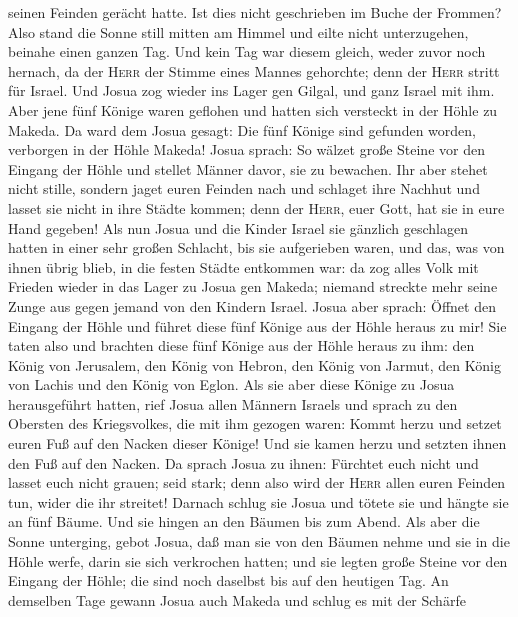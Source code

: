 seinen Feinden gerächt hatte. Ist dies nicht geschrieben im Buche der
Frommen? Also stand die Sonne still mitten am Himmel und eilte nicht
unterzugehen, beinahe einen ganzen Tag.  Und kein Tag war
diesem gleich, weder zuvor noch hernach, da der \textsc{Herr} der Stimme
eines Mannes gehorchte; denn der \textsc{Herr} stritt für Israel.
 Und Josua zog wieder ins Lager gen Gilgal, und ganz
Israel mit ihm.  Aber jene fünf Könige waren geflohen und
hatten sich versteckt in der Höhle zu Makeda.  Da ward
dem Josua gesagt: Die fünf Könige sind gefunden worden, verborgen in der
Höhle Makeda!  Josua sprach: So wälzet große Steine vor
den Eingang der Höhle und stellet Männer davor, sie zu bewachen.
 Ihr aber stehet nicht stille, sondern jaget euren
Feinden nach und schlaget ihre Nachhut und lasset sie nicht in ihre
Städte kommen; denn der \textsc{Herr}, euer Gott, hat sie in eure Hand
gegeben!  Als nun Josua und die Kinder Israel sie
gänzlich geschlagen hatten in einer sehr großen Schlacht, bis sie
aufgerieben waren, und das, was von ihnen übrig blieb, in die festen
Städte entkommen war:  da zog alles Volk mit Frieden
wieder in das Lager zu Josua gen Makeda; niemand streckte mehr seine
Zunge aus gegen jemand von den Kindern Israel.  Josua
aber sprach: Öffnet den Eingang der Höhle und führet diese fünf Könige
aus der Höhle heraus zu mir!  Sie taten also und brachten
diese fünf Könige aus der Höhle heraus zu ihm: den König von Jerusalem,
den König von Hebron, den König von Jarmut, den König von Lachis und den
König von Eglon.  Als sie aber diese Könige zu Josua
herausgeführt hatten, rief Josua allen Männern Israels und sprach zu den
Obersten des Kriegsvolkes, die mit ihm gezogen waren: Kommt herzu und
setzet euren Fuß auf den Nacken dieser Könige! Und sie kamen herzu und
setzten ihnen den Fuß auf den Nacken.  Da sprach Josua zu
ihnen: Fürchtet euch nicht und lasset euch nicht grauen; seid stark;
denn also wird der \textsc{Herr} allen euren Feinden tun, wider die ihr
streitet!  Darnach schlug sie Josua und tötete sie und
hängte sie an fünf Bäume. Und sie hingen an den Bäumen bis zum Abend.
 Als aber die Sonne unterging, gebot Josua, daß man sie
von den Bäumen nehme und sie in die Höhle werfe, darin sie sich
verkrochen hatten; und sie legten große Steine vor den Eingang der
Höhle; die sind noch daselbst bis auf den heutigen Tag. 
An demselben Tage gewann Josua auch Makeda und schlug es mit der Schärfe
